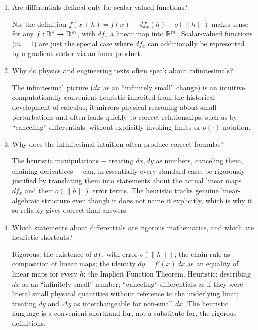 \documentclass{essay}
\begin{document}
\begin{enumerate}[resume, leftmargin=*, itemsep=8pt]
\item Are differentials defined only for scalar-valued functions?
\begin{answer}
No; the definition \(f(x+h)=f(x)+df_x(h)+o(\|h\|)\) makes sense for any \(f:\mathbb{R}^n\to\mathbb{R}^m\), with \(df_x\) a linear map into \(\mathbb{R}^m\). Scalar-valued functions (\(m=1\)) are just the special case where \(df_x\) can additionally be represented by a gradient vector via an inner product.
\end{answer}

\item Why do physics and engineering texts often speak about infinitesimals?
\begin{answer}
The infinitesimal picture (\(dx\) as an ``infinitely small'' change) is an intuitive, computationally convenient heuristic inherited from the historical development of calculus; it mirrors physical reasoning about small perturbations and often leads quickly to correct relationships, such as by ``canceling'' differentials, without explicitly invoking limits or \(o(\cdot)\) notation.
\end{answer}

\item Why does the infinitesimal intuition often produce correct formulas?
\begin{answer}
The heuristic manipulations \(-\) treating \(dx,dy\) as numbers, canceling them, chaining derivatives \(-\) can, in essentially every standard case, be rigorously justified by translating them into statements about the actual linear maps \(df_x\) and their \(o(\|h\|)\) error terms. The heuristic tracks genuine linear-algebraic structure even though it does not name it explicitly, which is why it so reliably gives correct final answers.
\end{answer}

\item Which statements about differentials are rigorous mathematics, and which are heuristic shortcuts?
\begin{answer}
Rigorous: the existence of \(df_x\) with error \(o(\|h\|)\); the chain rule as composition of linear maps; the identity \(dy=f'(x)\,dx\) as an equality of linear maps for every \(h\); the Implicit Function Theorem. Heuristic: describing \(dx\) as an ``infinitely small'' number; ``canceling'' differentials as if they were literal small physical quantities without reference to the underlying limit; treating \(dy\) and \(\Delta y\) as interchangeable for non-small \(dx\). The heuristic language is a convenient shorthand for, not a substitute for, the rigorous definitions.
\end{answer}

\end{enumerate}
\end{document}
